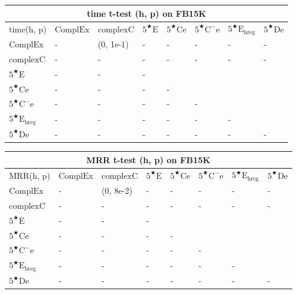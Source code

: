 \documentclass[11pt]{article}
\begin{document}
\begin{table}
\centering
\begin{tabular}{llllllll}
    \hline
    \multicolumn{8}{c}{time t-test (h, p) on FB15K}\\
    \hline
    time(h, p) & $\mathrm{ComplEx}$ & $\mathrm{complexC}$ & $5^{\bigstar}\mathrm{E}$ & $5^{\bigstar}\mathrm{Ce}$ & $5^{\bigstar}\mathrm{C^{-}e}$ & $5^{\bigstar}\mathrm{E_{hreg}}$ & $5^{\bigstar}\mathrm{De}$\\
    $\mathrm{ComplEx}$ & - & (0, 1e-1) & - & - & - & - & - \\
    $\mathrm{complexC}$ & - & - & - & - & - & - & - \\
    $5^{\bigstar}\mathrm{E}$ & - & - & -\\
    $5^{\bigstar}\mathrm{Ce}$ & - & - & - & -\\
    $5^{\bigstar}\mathrm{C^{-}e}$ & - & - & - & - & -\\
    $5^{\bigstar}\mathrm{E_{hreg}}$ & - & - & - & - & - & -\\
    $5^{\bigstar}\mathrm{De}$ & - & - & - & - & - & - & -\\
    \hline
\end{tabular}
\begin{tabular}{llllllll}
    \hline
    \multicolumn{8}{c}{MRR t-test (h, p) on FB15K}\\
    \hline
    MRR(h, p) & $\mathrm{ComplEx}$ & $\mathrm{complexC}$ & $5^{\bigstar}\mathrm{E}$ & $5^{\bigstar}\mathrm{Ce}$ & $5^{\bigstar}\mathrm{C^{-}e}$ & $5^{\bigstar}\mathrm{E_{hreg}}$ & $5^{\bigstar}\mathrm{De}$\\
    $\mathrm{ComplEx}$ & - & (0, 8e-2) & - & - & - & - & - \\
    $\mathrm{complexC}$ & - & - & - & - & - & - & - \\
    $5^{\bigstar}\mathrm{E}$ & - & - & -\\
    $5^{\bigstar}\mathrm{Ce}$ & - & - & - & -\\
    $5^{\bigstar}\mathrm{C^{-}e}$ & - & - & - & - & -\\
    $5^{\bigstar}\mathrm{E_{hreg}}$ & - & - & - & - & - & -\\
    $5^{\bigstar}\mathrm{De}$ & - & - & - & - & - & - & -\\
    \hline
\end{tabular}


\end{table}
\end{document}
